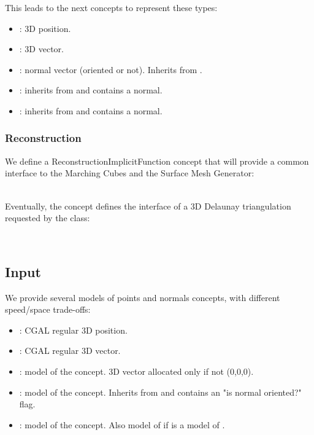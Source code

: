 This leads to the next concepts to represent these types:

\begin{itemize}
\item {}: 3D position.
\item {}: 3D vector.
\item {}: normal vector (oriented or not). Inherits from .
\item {}: inherits from  and contains a  normal.
\item {}: inherits from  and contains a  normal.
\end{itemize}

\subsubsection{Reconstruction}

We define a ReconstructionImplicitFunction concept that will provide
a common interface to the Marching Cubes and the Surface Mesh Generator:

  \\

Eventually, the  concept defines the interface of a 3D Delaunay triangulation requested by the  class:

  \\


\subsection{Input}

We provide several models of points and normals concepts, with different speed/space trade-offs:

\begin{itemize}
\item {}: CGAL regular 3D position.
\item {}: CGAL regular 3D vector.
\item {}: model of the  concept. 3D vector allocated only if not (0,0,0).
\item {}: model of the  concept.
Inherits from  and contains an "is normal oriented?" flag.
\item {}: model of the  concept.
Also model of  if  is a model of .
\end{itemize}

